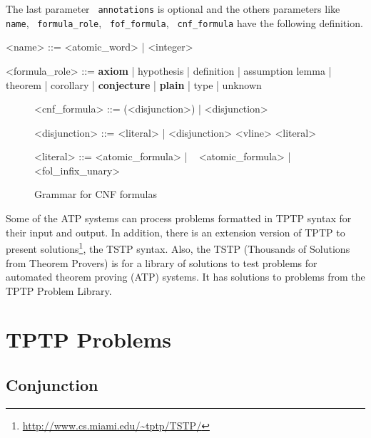 \documentclass[12pt]{article}
\newcommand{\ttext}[1]{\texttt{\color{black} #1}}
\newcommand{\problemtptp}[3][c]{}
\begin{document}
The last parameter \ttext{annotations} is optional and the others parameters like
\ttext{name}, \ttext{formula_role}, \ttext{fof_formula}, \ttext{cnf_formula} have
the following definition.

\begin{grammar}
<name> ::= <atomic_word> | <integer>

<formula_role> ::= {\bf axiom} | hypothesis | definition | assumption
\alt lemma | theorem | corollary | {\bf conjecture}
 | {\bf plain }| type | unknown
\end{grammar}

\begin{figure}[!ht]
\centering
\label{syntax:cnfformula}
\begin{grammar}
<cnf_formula> ::= (<disjunction>) | <disjunction>

<disjunction> ::= <literal> | <disjunction> <vline> <literal>

<literal> ::= <atomic_formula> | ~ <atomic_formula> | <fol_infix_unary>
\end{grammar}
\caption{Grammar for CNF formulas}
\end{figure}

Some of the ATP systems can process problems formatted
in TPTP syntax for their input and output. In addition, there is an extension
version of TPTP to present solutions\footnote{\url{http://www.cs.miami.edu/~tptp/TSTP/}},
the TSTP syntax. Also, the TSTP (Thousands of Solutions from Theorem Provers) is
for a library of solutions to test problems for automated theorem proving (ATP)
systems. It has solutions to problems from the TPTP Problem Library.\par

\section{TPTP Problems}

\subsection{Conjunction}
\problemtptp[conj-1.tptp]{problems/conjunction/conj-1.tptp}{2}
\problemtptp[conj-2.tptp]{problems/conjunction/conj-2.tptp}{2}
\problemtptp[conj-3.tptp]{problems/conjunction/conj-3.tptp}{2}
\problemtptp[conj-4.tptp]{problems/conjunction/conj-4.tptp}{2}
\problemtptp[conj-5.tptp]{problems/conjunction/conj-5.tptp}{2}
\problemtptp[conj-6.tptp]{problems/conjunction/conj-6.tptp}{2}
\end{document}
